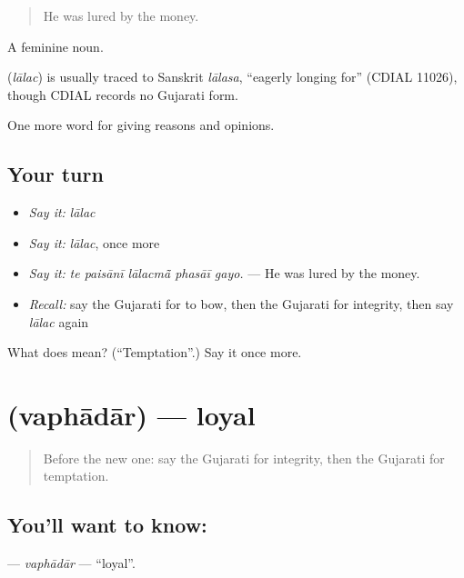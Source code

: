 \begin{quote}
He was lured by the money.
\end{quote}

A feminine noun.

\begin{cousinweb}
\textbf{} (\emph{lālac}) is usually traced to Sanskrit \emph{lālasa}, \textquotedblleft{}eagerly longing for\textquotedblright{} (CDIAL 11026), though CDIAL records no Gujarati form.
\end{cousinweb}

\begin{grammarlens}[title={What you've built}]
One more word for giving reasons and opinions.
\end{grammarlens}

\subsection*{Your turn}
\begin{itemize}
\raggedright
  \item \emph{Say it:} \emph{lālac}
  \item \emph{Say it:} \emph{lālac}, once more
  \item \emph{Say it:} \emph{te paisānī lālacmā̃ phasāī gayo.} — He was lured by the money.
  \item \emph{Recall:} say the Gujarati for to bow, then the Gujarati for integrity, then say \emph{lālac} again
\end{itemize}

\begin{tcolorbox}[breakable,colback=teal!4,colframe=teal!35!black,title={Before you move on}]
What does  mean? (\textquotedblleft{}Temptation\textquotedblright{}.) Say it once more.
\end{tcolorbox}
\section[\texorpdfstring{\gu{વફાદાર} (vaphādār)}{વફાદાર (vaphādār)}]{ (vaphādār) — loyal}

\label{lesson:GU-C360-vaphadar}



\begin{quote}
Before the new one: say the Gujarati for integrity, then the Gujarati for temptation.
\end{quote}

\subsection*{You'll want to know: }
\textbf{} — \emph{vaphādār} — \textquotedblleft{}loyal\textquotedblright{}.

